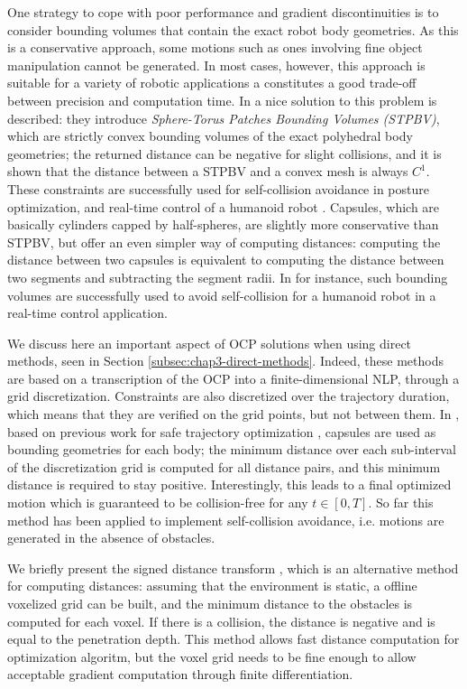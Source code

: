 One strategy to cope with poor performance and gradient
discontinuities is to consider bounding volumes that contain the exact
robot body geometries. As this is a conservative approach, some
motions such as ones involving fine object manipulation cannot be
generated. In most cases, however, this approach is suitable for a
variety of robotic applications a constitutes a good trade-off between
precision and computation time. In \cite{Escande2007} a nice solution
to this problem is described: they introduce \emph{Sphere-Torus
  Patches Bounding Volumes (STPBV)}, which are strictly convex
bounding volumes of the exact polyhedral body geometries; the returned
distance can be negative for slight collisions, and it is shown that
the distance between a STPBV and a convex mesh is always $C^1$. These
constraints are successfully used for self-collision avoidance in
posture optimization, and real-time control of a humanoid robot
\cite{Stasse2008}. Capsules, which are basically cylinders capped by
half-spheres, are slightly more conservative than STPBV, but offer an
even simpler way of computing distances: computing the distance
between two capsules is equivalent to computing the distance between
two segments and subtracting the segment radii. In \cite{Kanoun2011}
for instance, such bounding volumes are successfully used to avoid
self-collision for a humanoid robot in a real-time control
application.

We discuss here an important aspect of OCP solutions when using direct
methods, seen in Section \ref{subsec:chap3-direct-methods}. Indeed,
these methods are based on a transcription of the OCP into a
finite-dimensional NLP, through a grid discretization. Constraints are
also discretized over the trajectory duration, which means that they
are verified on the grid points, but not between them. In
\cite{lee2012accurate}, based on previous work for safe trajectory
optimization \cite{Lengagne2010}, capsules are used as bounding
geometries for each body; the minimum distance over each sub-interval
of the discretization grid is computed for all distance pairs, and
this minimum distance is required to stay positive. Interestingly,
this leads to a final optimized motion which is guaranteed to be
collision-free for any $t\in[0,T]$. So far this method has been
applied to implement self-collision avoidance, i.e. motions are
generated in the absence of obstacles.

We briefly present the signed distance transform
\cite{felzenszwalb2004distance}, which is an alternative method for
computing distances: assuming that the environment is static, a
offline voxelized grid can be built, and the minimum distance to the
obstacles is computed for each voxel. If there is a collision, the
distance is negative and is equal to the penetration depth. This
method allows fast distance computation for optimization algoritm, but
the voxel grid needs to be fine enough to allow acceptable gradient
computation through finite differentiation.

